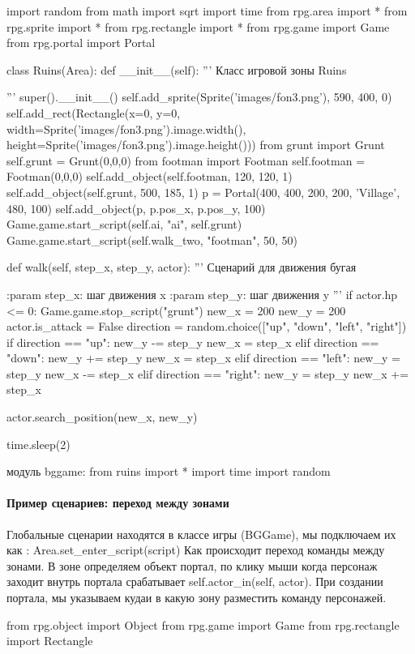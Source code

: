 import random
from math import sqrt
import time
from rpg.area import *
from rpg.sprite import *
from rpg.rectangle import *
from rpg.game import Game
from rpg.portal import Portal

class Ruins(Area):
def \_\_init\_\_(self):
'''
Класс игровой зоны Ruins

'''
super().\_\_init\_\_()
self.add\_sprite(Sprite('images/fon3.png'), 590, 400, 0)
self.add\_rect(Rectangle(x=0, y=0, width=Sprite('images/fon3.png').image.width(), height=Sprite('images/fon3.png').image.height()))
from grunt import Grunt
self.grunt = Grunt(0,0,0)
from footman import Footman
self.footman = Footman(0,0,0)
self.add\_object(self.footman, 120, 120, 1)
self.add\_object(self.grunt, 500, 185, 1)
p = Portal(400, 400, 200, 200, 'Village', 480, 100)
self.add\_object(p, p.pos\_x, p.pos\_y, 100)
Game.game.start\_script(self.ai, "ai", self.grunt)
Game.game.start\_script(self.walk\_two, "footman", 50, 50)


def walk(self, step\_x, step\_y, actor):
'''
Сценарий для движения бугая

:param step\_x: шаг движения x
:param step\_y: шаг движения y
'''
if actor.hp <= 0:
Game.game.stop\_script("grunt")
new\_x = 200
new\_y = 200
actor.is\_attack = False
direction = random.choice(["up", "down", "left", "right"])
if direction == "up":
new\_y -= step\_y
new\_x = step\_x
elif direction == "down":
new\_y += step\_y
new\_x = step\_x
elif direction == "left":
new\_y = step\_y
new\_x -= step\_x
elif direction == "right":
new\_y = step\_y
new\_x += step\_x

actor.search\_position(new\_x, new\_y)

time.sleep(2)

модуль bggame:
from ruins import *
import time
import random

\paragraph{Пример сценариев: переход между зонами}
Глобальные сценарии находятся в классе игры (BGGame), мы подключаем их как :
Area.set\_enter\_script(script)
Как происходит переход команды между зонами.
В зоне определяем объект портал, по клику мыши когда персонаж заходит внутрь портала срабатывает self.actor\_in(self, actor). При создании портала, мы указываем кудаи в какую зону разместить команду персонажей.

from rpg.object import Object
from rpg.game import Game
from rpg.rectangle import Rectangle

